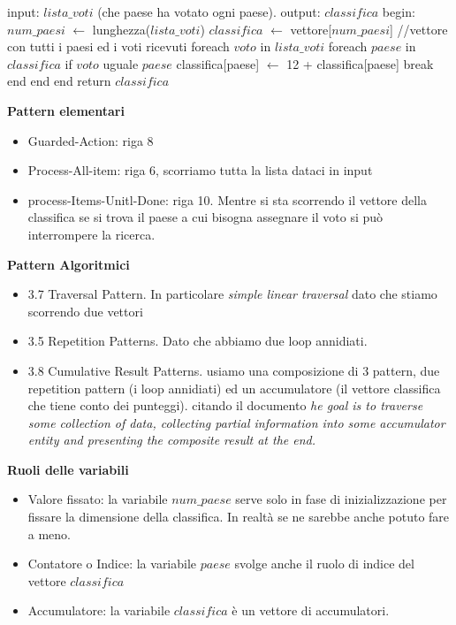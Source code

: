 \documentclass[a4paper]{article}
\begin{document}
\begin{algorithm}[caption={Calcolo punteggi}, label={alg2}]
	input: $lista\_voti$ (che paese ha votato ogni paese).
	output: $classifica$ 
	begin: 
	$num\_paesi$ $\gets$ lunghezza($lista\_voti$)
	$classifica$ $\gets$ vettore[$num\_paesi$] //vettore con tutti i paesi ed i voti ricevuti
	foreach $voto$ in $lista\_voti$
		foreach $paese$ in $classifica$
			if $voto$ uguale $paese$
				classifica[paese] $\gets$ 12 + classifica[paese]
				break
			end
		end
	end
	return $classifica$
\end{algorithm}

\textbf{Pattern elementari}
\begin{itemize}
	\item Guarded-Action: riga 8
	\item Process-All-item: riga 6, scorriamo tutta la lista dataci in input
	\item process-Items-Unitl-Done: riga 10. Mentre si sta scorrendo il vettore della classifica se si trova il paese a cui bisogna assegnare il voto si può interrompere la ricerca.
\end{itemize}

\textbf{Pattern Algoritmici}
\begin{itemize}
	\item 3.7 Traversal Pattern. In particolare \textit{simple linear traversal} dato che stiamo scorrendo due vettori
	\item 3.5 Repetition Patterns. Dato che abbiamo due loop annidiati.
	\item 3.8 Cumulative Result Patterns. usiamo una composizione di 3 pattern, due repetition pattern (i loop annidiati) ed un accumulatore (il vettore classifica che tiene conto dei punteggi). citando il documento \cite{articolo} \textit{he goal is to traverse some collection of data, collecting partial information into some accumulator entity and presenting the composite result at the end.}

\end{itemize}
\textbf{Ruoli delle variabili}

\begin{itemize}
	\item Valore fissato: la variabile $num\_paese$ serve solo in fase di inizializzazione per fissare la dimensione della classifica. In realtà se ne sarebbe anche potuto fare a meno.
	\item Contatore o Indice: la variabile $paese$ svolge anche il ruolo di indice del vettore $classifica$
	\item Accumulatore: la variabile $classifica$ è un vettore di accumulatori.
\end{itemize}
\end{document}
